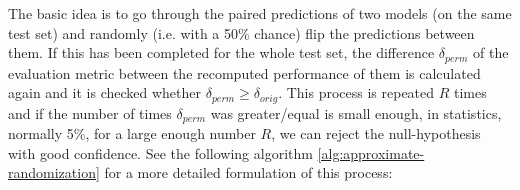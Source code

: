 






The basic idea is to go through the paired predictions of two models (on
the same test set) and
randomly (i.e. with a 50\% chance) flip the predictions between them. If
this has been completed for the whole test set, the difference $\delta_{perm}$ of the
evaluation metric between the recomputed performance of them is calculated again
and it is checked whether $\delta_{perm} \geq \delta_{orig}$. This process is repeated
$R$ times and if the number of times $\delta_{perm}$ was greater/equal is small
enough, in statistics, normally 5\%, for a large enough number $R$, we can reject
the null-hypothesis with good confidence. See the following algorithm \ref{alg:approximate-randomization}
for a more detailed formulation of this process:

